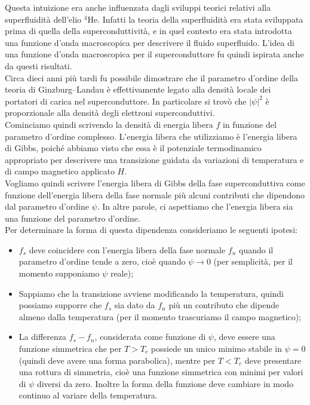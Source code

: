 Questa intuizione era anche influenzata dagli sviluppi teorici relativi alla superfluidità dell'elio $^4\mathrm{He}$. Infatti la teoria della superfluidità era stata sviluppata prima di quella della superconduttività, e in quel contesto era stata introdotta una funzione d'onda macroscopica per descrivere il fluido superfluido. L'idea di una funzione d'onda macroscopica per il superconduttore fu quindi ispirata anche da questi risultati.\\
Circa dieci anni più tardi fu possibile dimostrare che il parametro d'ordine della teoria di Ginzburg--Landau è effettivamente legato alla densità locale dei portatori di carica nel superconduttore. In particolare si trovò che $|\psi|^2$ è proporzionale alla densità degli elettroni superconduttivi.\\
Cominciamo quindi scrivendo la densità di energia libera $f$ in funzione del parametro d'ordine complesso. L'energia libera che utilizziamo è l'energia libera di Gibbs, poiché abbiamo visto che essa è il potenziale termodinamico appropriato per descrivere una transizione guidata da variazioni di temperatura e di campo magnetico applicato $H$.\\
Vogliamo quindi scrivere l'energia libera di Gibbs della fase superconduttiva come funzione dell'energia libera della fase normale più alcuni contributi che dipendono dal parametro d'ordine $\psi$. In altre parole, ci aspettiamo che l'energia libera sia una funzione del parametro d'ordine.\\
Per determinare la forma di questa dipendenza consideriamo le seguenti ipotesi:
\begin{itemize}[leftmargin=0.5cm]
   \item $f_s$ deve coincidere con l'energia libera della fase normale $f_n$ quando il parametro d'ordine tende a zero, cioè quando $\psi \to 0$ (per semplicità, per il momento supponiamo $\psi$ reale);
   \item Sappiamo che la transizione avviene modificando la temperatura, quindi possiamo supporre che $f_s$ sia dato da $f_n$ più un contributo che dipende almeno dalla temperatura (per il momento trascuriamo il campo magnetico);
   \item La differenza $f_s - f_n$, considerata come funzione di $\psi$, deve essere una funzione simmetrica che per $T>T_c$ possiede un unico minimo stabile in $\psi=0$ (quindi deve avere una forma parabolica), mentre per $T<T_c$ deve presentare una rottura di simmetria, cioè una funzione simmetrica con minimi per valori di $\psi$ diversi da zero. Inoltre la forma della funzione deve cambiare in modo continuo al variare della temperatura.
\end{itemize}
